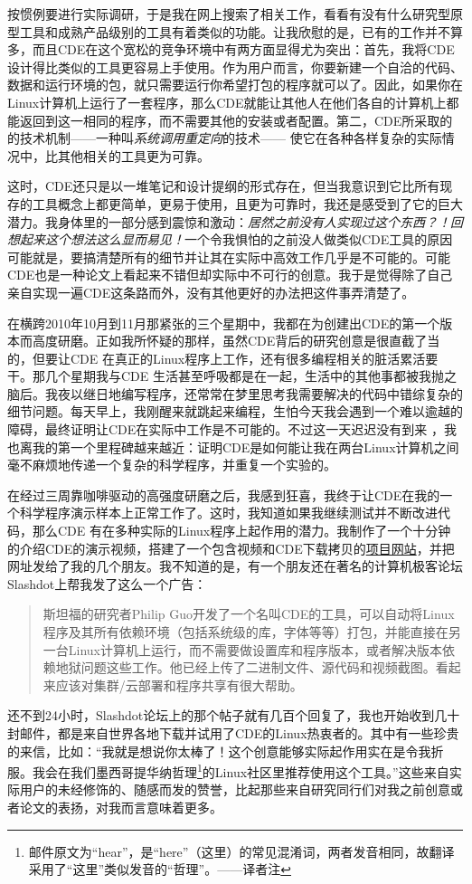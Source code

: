 \documentclass[letter,12pt]{book}
\begin{document}
\begin{CJK}{UTF8}{gbsn}
按惯例要进行实际调研，于是我在网上搜索了相关工作，看看有没有什么研究型原型工具和成熟产品级别的工具有着类似的功能。让我欣慰的是，已有的工作并不算多，而且CDE在这个宽松的竞争环境中有两方面显得尤为突出：首先，我将CDE设计得比类似的工具更容易上手使用。作为用户而言，你要新建一个自洽的代码、数据和运行环境的包，就只需要运行你希望打包的程序就可以了。因此，如果你在Linux计算机上运行了一套程序，那么CDE就能让其他人在他们各自的计算机上都能返回到这一相同的程序，而不需要其他的安装或者配置。第二，CDE所采取的的技术机制——一种叫\emph{系统调用重定向}的技术—— 使它在各种各样复杂的实际情况中，比其他相关的工具更为可靠。

这时，CDE还只是以一堆笔记和设计提纲的形式存在，但当我意识到它比所有现存的工具概念上都更简单，更易于使用，且更为可靠时，我还是感受到了它的巨大潜力。我身体里的一部分感到震惊和激动：\emph{居然之前没有人实现过这个东西？！回想起来这个想法这么显而易见！}一个令我惧怕的之前没人做类似CDE工具的原因可能就是，要搞清楚所有的细节并让其在实际中高效工作几乎是不可能的。可能CDE也是一种论文上看起来不错但却实际中不可行的创意。我于是觉得除了自己亲自实现一遍CDE这条路而外，没有其他更好的办法把这件事弄清楚了。

在横跨2010年10月到11月那紧张的三个星期中，我都在为创建出CDE的第一个版本而高度研磨。正如我所怀疑的那样，虽然CDE背后的研究创意是很直截了当的，但要让CDE 在真正的Linux程序上工作，还有很多编程相关的脏活累活要干。那几个星期我与CDE 生活甚至呼吸都是在一起，生活中的其他事都被我抛之脑后。我夜以继日地编写程序，还常常在梦里思考我需要解决的代码中错综复杂的细节问题。每天早上，我刚醒来就跳起来编程，生怕今天我会遇到一个难以逾越的障碍，最终证明让CDE在实际中工作是不可能的。不过这一天迟迟没有到来 ，我也离我的第一个里程碑越来越近：证明CDE是如何能让我在两台Linux计算机之间毫不麻烦地传递一个复杂的科学程序，并重复一个实验的。

在经过三周靠咖啡驱动的高强度研磨之后，我感到狂喜，我终于让CDE在我的一个科学程序演示样本上正常工作了。这时，我知道如果我继续测试并不断改进代码，那么CDE 有在多种实际的Linux程序上起作用的潜力。我制作了一个十分钟的介绍CDE的演示视频，搭建了一个包含视频和CDE下载拷贝的\href{http://www.pgbovine.net/cde.html}{项目网站}，并把网址发给了我的几个朋友。我不知道的是，有一个朋友还在著名的计算机极客论坛Slashdot上帮我发了这么一个广告：
\begin{quote}
  斯坦福的研究者Philip Guo开发了一个名叫CDE的工具，可以自动将Linux程序及其所有依赖环境（包括系统级的库，字体等等）打包，并能直接在另一台Linux计算机上运行，而不需要做设置库和程序版本，或者解决版本依赖地狱问题这些工作。他已经上传了二进制文件、源代码和视频截图。看起来应该对集群/云部署和程序共享有很大帮助。
\end{quote}
还不到24小时，Slashdot论坛上的那个帖子就有几百个回复了，我也开始收到几十封邮件，都是来自世界各地下载并试用了CDE的Linux热衷者的。其中有一些珍贵的来信，比如：“我就是想说你太棒了！这个创意能够实际起作用实在是令我折服。我会在我们墨西哥提华纳哲理\footnote{邮件原文为``hear''，是``here''（这里）的常见混淆词，两者发音相同，故翻译采用了“这里”类似发音的“哲理”。——译者注}的Linux社区里推荐使用这个工具。”这些来自实际用户的未经修饰的、随感而发的赞誉，比起那些来自研究同行们对我之前创意或者论文的表扬，对我而言意味着更多。


\end{CJK}
\end{document}
